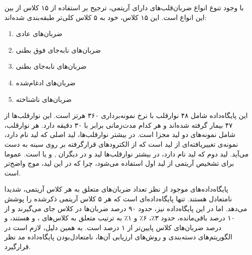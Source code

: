 با وجود تنوع انواع ضربان‌قلب‌های دارای آریتمی، ترجیح  بر استفاده از ۱۵ کلاس از بین این انواع است. این ۱۵ کلاس، خود به ۵ کلاس کلی‌تر طبقه‌بندی شده‌اند: 
\begin{enumerate}
	\item ضربان‌های عادی 
	\item ضربان‌های نابه‌جای فوق بطنی 
	\item ضربان‌های نابه‌جای بطنی 
	\item ضربان‌‌های ادغام‌شده 
	\item ضربان‌های ناشناخته 
\end{enumerate}

این پایگاه‌داده‌ شامل ۴۸ نوارقلب با نرخ نمونه‌برداری ۳۶۰ هرتز است. این نوارقلب‌ها از ۴۷ بیمار گرفته شده‌اند و هر کدام مدت‌زمانی برابر با ۳۰ دقیقه دارد. هر نوارقلب، شامل نمونه‌های دو لید مجزا است. در بیشتر نوارقلب‌ها، لید اصلی که لید  نام دارد، نمونه‌ی تغییریافته‌ای از لید  است که از الکترودهای قرارگرفته بر روی سینه به دست می‌آید. لید دوم که لید  نام دارد، در بیشتر نوارقلب‌ها لید  و در دیگران ,  و یا  است. عموما برای تشخیص آریتمی از لید اول  استفاده می‌شود، چرا که در این لید، موج  واضح‌تر است.\cite{ECGSurvey}

پایگاه‌داده‌های موجود از نظر تعداد ضربان‌های متعلق به هر کلاس آریتمی، شدیدا نامتعادل هستند.  تنها پایگاه‌داده‌ای است که هر ۵ کلاس آریتمی ذکرشده را پوشش می‌دهد. اما در این پایگاه‌داده نیز، حدود ۹۰ درصد ضربان‌ها در کلاس  جای می‌گیرند و از ۱۰ درصد باقی‌مانده، حدود ۳٪، ۶٪ و ۱٪ به ترتیب متعلق به کلاس‌های ،  و  هستند، و درصد ضربان‌های کلاس  پایین‌تر از ۱ درصد است.\cite{Mondejar} به همین دلیل، لازم است در الگوریتم‌های دسته‌بندی و روش‌های ارزیابی آن‌ها، نامتعادل‌بودن پایگاه‌داده مد نظر قرارگیرد.

